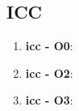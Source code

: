 \documentclass{article}
\begin{document}
\subsection*{ICC}
\begin{enumerate}
	\item \textbf{icc - O0}:
	\item \textbf{icc - O2}:
	\item \textbf{icc - O3}:
\end{enumerate}
\end{document}
